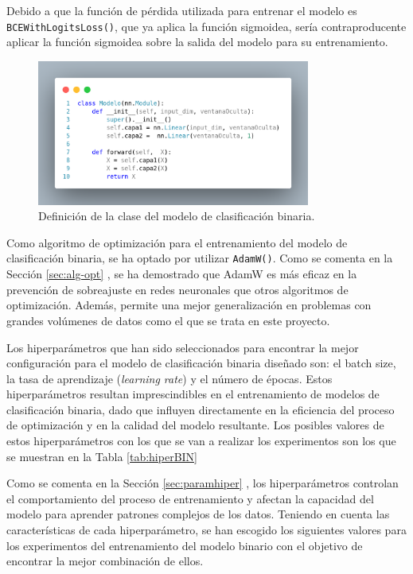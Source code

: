 Debido a que la función de pérdida utilizada para entrenar el modelo es \texttt{BCEWithLogitsLoss()}, que ya aplica la función sigmoidea, sería contraproducente aplicar la función sigmoidea sobre la salida del modelo para su entrenamiento.

\begin{figure}[H]
    \centering
    \includegraphics[width=0.8\textwidth]{./img/modelo/codigo/modeloBIN.png}
    \caption{Definición de la clase del modelo de clasificación binaria.}
    \label{fig:modBIN}
\end{figure}

Como algoritmo de optimización para el entrenamiento del modelo de clasificación binaria, se ha optado por utilizar \texttt{AdamW()}. Como se comenta en la Sección \ref{sec:alg-opt} , se ha demostrado que AdamW es más eficaz en la prevención de sobreajuste en redes neuronales que otros algoritmos de optimización. Además, permite una mejor generalización en problemas con grandes volúmenes de datos como el que se trata en este proyecto.

Los hiperparámetros que han sido seleccionados para encontrar la mejor configuración para el modelo de clasificación binaria diseñado son: el batch size, la tasa de aprendizaje (\textit{learning rate}) y el número de épocas. Estos hiperparámetros resultan imprescindibles en el entrenamiento de modelos de clasificación binaria, dado que influyen directamente en la eficiencia del proceso de optimización y en la calidad del modelo resultante. Los posibles valores de estos hiperparámetros con los que se van a realizar los experimentos son los que se muestran en la Tabla \ref{tab:hiperBIN}

Como se comenta en la Sección \ref{sec:paramhiper} , los hiperparámetros controlan el comportamiento del proceso de entrenamiento y afectan la capacidad del modelo para aprender patrones complejos de los datos. Teniendo en cuenta las características de cada hiperparámetro, se han escogido los siguientes valores para los experimentos del entrenamiento del modelo binario con el objetivo de encontrar la mejor combinación de ellos.

